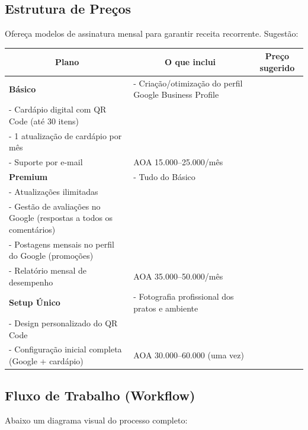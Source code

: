 \documentclass[a4paper,12pt]{article}
\begin{document}
\subsection{Estrutura de Preços}
Ofereça modelos de assinatura mensal para garantir receita recorrente. Sugestão:

\vspace{0.5cm}
\begin{center}
\begin{tabular}{|p{3cm}|p{7cm}|p{4cm}|}
\hline
\multicolumn{1}{|c|}{\textbf{Plano}} & \multicolumn{1}{c|}{\textbf{O que inclui}} & \multicolumn{1}{c|}{\textbf{Preço sugerido}} \\
\hline
\textbf{Básico} & 
- Criação/otimização do perfil Google Business Profile \\
- Cardápio digital com QR Code (até 30 itens) \\
- 1 atualização de cardápio por mês \\
- Suporte por e-mail &
AOA 15.000–25.000/mês \\
\hline
\textbf{Premium} & 
- Tudo do Básico \\
- Atualizações ilimitadas \\
- Gestão de avaliações no Google (respostas a todos os comentários) \\
- Postagens mensais no perfil do Google (promoções) \\
- Relatório mensal de desempenho &
AOA 35.000–50.000/mês \\
\hline
\textbf{Setup Único} & 
- Fotografia profissional dos pratos e ambiente \\
- Design personalizado do QR Code \\
- Configuração inicial completa (Google + cardápio) &
AOA 30.000–60.000 (uma vez) \\
\hline
\end{tabular}
\end{center}
\vspace{0.5cm}

\subsection{Fluxo de Trabalho (Workflow)}
Abaixo um diagrama visual do processo completo:
\end{document}
